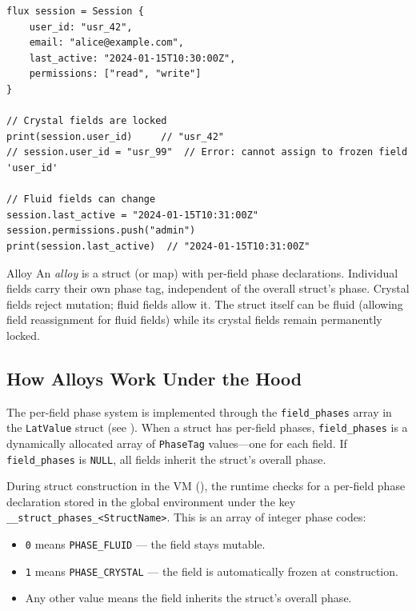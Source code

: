 \begin{lstlisting}[language=Lattice, caption={Creating an alloy struct instance}]
flux session = Session {
    user_id: "usr_42",
    email: "alice@example.com",
    last_active: "2024-01-15T10:30:00Z",
    permissions: ["read", "write"]
}

// Crystal fields are locked
print(session.user_id)     // "usr_42"
// session.user_id = "usr_99"  // Error: cannot assign to frozen field 'user_id'

// Fluid fields can change
session.last_active = "2024-01-15T10:31:00Z"
session.permissions.push("admin")
print(session.last_active)  // "2024-01-15T10:31:00Z"
\end{lstlisting}

\begin{defnbox}{Alloy}
An \emph{alloy} is a struct (or map) with per-field phase declarations.
Individual fields carry their own phase tag, independent of the overall struct's phase.
Crystal fields reject mutation; fluid fields allow it.
The struct itself can be fluid (allowing field reassignment for fluid fields) while its crystal fields remain permanently locked.
\end{defnbox}

\subsection{How Alloys Work Under the Hood}

The per-field phase system is implemented through the \lstinline|field_phases| array in the \lstinline|LatValue| struct (see ).
When a struct has per-field phases, \lstinline|field_phases| is a dynamically allocated array of \lstinline|PhaseTag| values---one for each field.
If \lstinline|field_phases| is \lstinline|NULL|, all fields inherit the struct's overall phase.

During struct construction in the VM (), the runtime checks for a per-field phase declaration stored in the global environment under the key \lstinline|__struct_phases_<StructName>|.
This is an array of integer phase codes:

\begin{itemize}
  \item \lstinline|0| means \lstinline|PHASE_FLUID| --- the field stays mutable.
  \item \lstinline|1| means \lstinline|PHASE_CRYSTAL| --- the field is automatically frozen at construction.
  \item Any other value means the field inherits the struct's overall phase.
\end{itemize}

